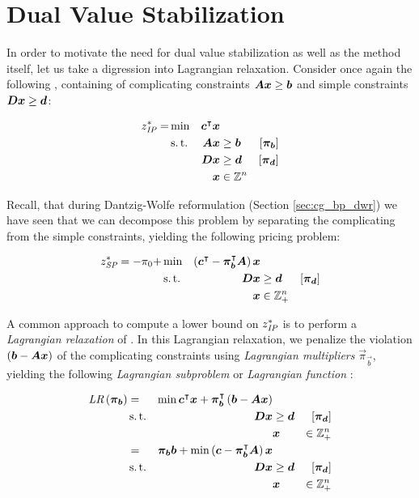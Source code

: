 \section{Dual Value Stabilization}\label{sec:cg_bp_dvs}
In order to motivate the need for dual value stabilization as well as the method itself, let us take a digression into Lagrangian relaxation. Consider once again the following \IP{}, containing of complicating constraints ${\bm{A}} {\bm{x}} \geq {\bm{b}}$ and simple constraints ${\bm{D}} {\bm{x}} \geq {\bm{d}}$:

\begin{equation*}
\begin{aligned}
z^*_{\textit{IP}}{} = &\min & {\bm{c}}^\intercal {\bm{x}} & & & \\
&\operatorname{s.t.} & {\bm{A}} {\bm{x}} & \geq {\bm{b}} & \left[{\bm{\pi}}_{\bm{b}}\right] & \\
&& {\bm{D}} {\bm{x}} & \geq {\bm{d}} & \left[{\bm{\pi}}_{\bm{d}}\right] & \\
&& {\bm{x}} & \in \mathbb{Z}^n
\end{aligned}
\end{equation*}

Recall, that during Dantzig-Wolfe reformulation (Section \ref{sec:cg_bp_dwr}) we have seen that we can decompose this problem by separating the complicating from the simple constraints, yielding the following pricing problem:

\begin{equation*}
\begin{aligned}
z^*_\SP{} = -\pi_0 + &\min & \left( \vec{c}\transpose - \vec{\pi}_\vec{b}\transpose \mat{A} \right) \vec{x} & & \\
&\st & \mat{D} \vec{x} & \geq \vec{d} & \left[\vec{\pi}_\vec{d}\right] \\
&& \vec{x} & \in \mathbb{Z}_+^n
\end{aligned}
\end{equation*}

A common approach to compute a lower bound on $z^*_{\textit{IP}}{}$ is to perform a \textit{Lagrangian relaxation} of \IP{}. In this Lagrangian relaxation, we penalize the violation $({\bm{b}} - {\bm{A}} {\bm{x}})$ of the complicating constraints using \textit{Lagrangian multipliers} $\vec{\pi}_\vec{b}$, yielding the following \textit{Lagrangian subproblem} or \textit{Lagrangian function} \cite{thebook}:

\begin{equation*}
\begin{aligned}
\LR{\vec{\pi}_\vec{b}} &= & \min \vec{c}\transpose \vec{x} + \vec{\pi}_\vec{b}\transpose \left( \vec{b} - \mat{A}\vec{x} \right) & & \\
& \st & \mat{D} \vec{x} & \geq \vec{d} & \left[\vec{\pi}_\vec{d}\right] \\
&&& \vec{x} & \in \mathbb{Z}_+^n \\
&= & \vec{\pi}_\vec{b} \vec{b} + \min \left( \vec{c} - \vec{\pi}_\vec{b}\transpose \mat{A} \right) \vec{x} & & \\
& \st & \mat{D} \vec{x} & \geq \vec{d} & \left[\vec{\pi}_\vec{d}\right] \\
&&& \vec{x} & \in \mathbb{Z}_+^n
\end{aligned}
\end{equation*}

